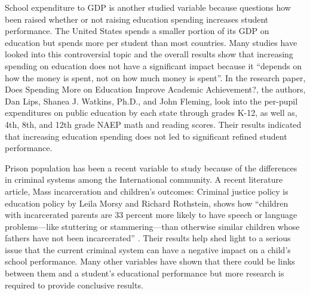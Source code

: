 \documentclass[12pt,english]{article}
\begin{document}
School expenditure to GDP is another studied variable because questions how been raised whether or not raising education spending increases student performance. The United States spends a smaller portion of its GDP on education but spends more per student than most countries. Many studies have looked into this controversial topic and the overall results show that increasing spending on education does not have a significant impact because it “depends on how the money is spent, not on how much money is spent”\cite{lips2008does}. In the research paper, Does Spending More on Education Improve Academic Achievement?, the authors, Dan Lips, Shanea J. Watkins, Ph.D., and John Fleming, look into the per-pupil expenditures on public education by each state through grades K-12, as well as, 4th, 8th, and 12th grade NAEP math and reading scores. Their results indicated that increasing education spending does not led to significant refined student performance. 

Prison population has been a recent variable to study because of the differences in criminal systems among the International community. A recent literature article, Mass incarceration and children’s outcomes: Criminal justice policy is education policy by Leila Morsy and Richard Rothstein, shows how “children with incarcerated parents are 33 percent more likely to have speech or language problems—like stuttering or stammering—than otherwise similar children whose fathers have not been incarcerated” \cite{morsy2016mass}. Their results help shed light to a serious issue that the current criminal system can have a negative impact on a child’s school performance. Many other variables have shown that there could be links between them and a student's educational performance but more research is required to provide conclusive results.
\end{document}
